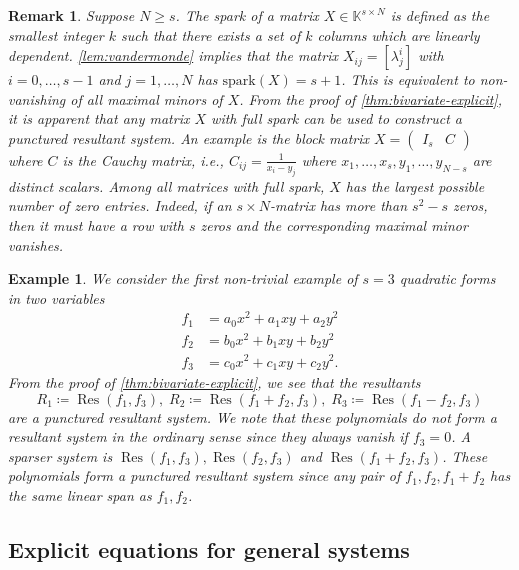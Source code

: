 \documentclass[11pt,a4paper]{article}
\newtheorem{remark}[theorem]{Remark}\AddToHook{env/remark/begin}{\crefalias{theorem}{remark}}
\newtheorem{example}[theorem]{Example}\AddToHook{env/example/begin}{\crefalias{theorem}{example}}
\numberwithin{equation}{section}
\newcommand{\KK}{\mathbb{K}}
\DeclareMathOperator{\Res}{Res}
\begin{document}
\begin{remark}
    Suppose $N\geq s$.
    The \emph{spark} of a matrix $X\in\KK^{s\times N}$ is defined as the smallest integer $k$ such that there exists a set of $k$ columns which are linearly dependent. 
    \cref{lem:vandermonde} implies that the matrix $X_{ij}=[\lambda_j^{i}]$ with $i=0,\dots,s-1$ and  $j=1,\dots,N$ has $\mathrm{spark}(X)=s+1$.
    This is equivalent to non-vanishing of all maximal minors of $X$.
    From the proof of \cref{thm:bivariate-explicit}, it is apparent that any matrix $X$ with full spark can be used to construct a punctured resultant system.
    An example is the block matrix $X=\begin{pmatrix}
        I_s & C
    \end{pmatrix}$
    where $C$ is the \emph{Cauchy matrix}, i.e., $C_{ij}=\frac{1}{x_i-y_j}$ where $x_1,\dots,x_s,y_1,\dots,y_{N-s}$ are distinct scalars.
    Among all matrices with full spark, $X$ has the largest possible number of zero entries.
    Indeed, if an $s\times N$-matrix has more than $s^2-s$ zeros, then it must have a row with $s$ zeros and the corresponding maximal minor vanishes.
\end{remark}


\begin{example}
    We consider the first non-trivial example of $s=3$ quadratic forms in two variables \[
    \begin{split}
            f_1 &= a_0 x^2 + a_1 xy + a_2 y^2\\
            f_2 &= b_0 x^2 + b_1 xy + b_2 y^2\\
            f_3 &= c_0 x^2 + c_1 xy + c_2 y^2.
    \end{split}
    \]
    From the proof of \cref{thm:bivariate-explicit}, we see that the resultants \[
    R_1\coloneqq \Res(f_1, f_3), \; R_2\coloneqq\Res(f_1+f_2,f_3),\; R_3\coloneqq \Res(f_1 - f_2, f_3)
    \] are a punctured resultant system.
    We note that these polynomials do not form a resultant system in the ordinary sense since they always vanish if $f_3=0$.
    A sparser system is $\Res(f_1,f_3), \Res(f_2,f_3)$ and $\Res(f_1+f_2,f_3)$. 
    These polynomials form a punctured resultant system since any pair of $f_1,f_2,f_1+f_2$ has the same linear span as $f_1,f_2$.
\end{example}

\subsection{Explicit equations for general systems}
\end{document}
